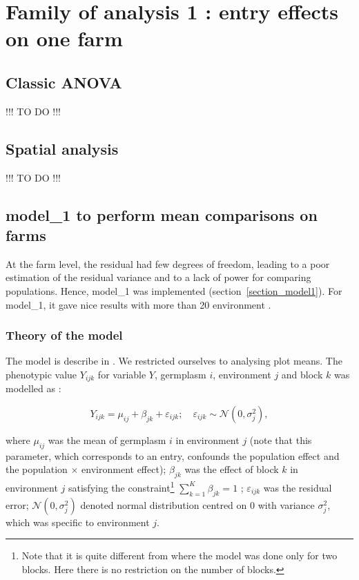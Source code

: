 \documentclass{book}\usepackage[]{graphicx}\usepackage[]{color}
\begin{document}
\newpage


\section{Family of analysis 1 : entry effects on one farm}
\label{section_analysis1}


\subsection{Classic ANOVA}
\label{classic_anova}

!!! TO DO !!!

\newpage


\subsection{Spatial analysis}
\label{spatial_analysis}


!!! TO DO !!!

\newpage


\subsection{model\_1 to perform mean comparisons on farms }
\label{model_1}

At the farm level, the residual had few degrees of freedom, leading to a poor estimation of the residual variance and to a lack of power for comparing populations.
Hence, model\_1 was implemented (section~\ref{section_model1}).
For model\_1, it gave nice results with more than 20 environment \citep{riviere_hierarchical_2015}.

\subsubsection{Theory of the model}

The model is describe in \citet{riviere_hierarchical_2015}.
We restricted ourselves to analysing plot means.
The phenotypic value $Y_{ijk}$ for variable $Y$, germplasm $i$, environment $j$ and block $k$ was modelled as :

\begin{equation}
	Y_{ijk} = \mu_{ij} + \beta_{jk} + \varepsilon_{ijk} ; \quad \varepsilon_{ijk} \sim \mathcal{N} (0,\sigma^2_{j}),
	\label{model1}
\end{equation}

where
$\mu_{ij}$ was the mean of germplasm $i$ in environment $j$ (note that this parameter, which corresponds to an entry, confounds the population effect and the population $\times$ environment effect);
$\beta_{jk}$ was the effect of block $k$ in environment $j$ satisfying the constraint\footnote{Note that it is quite different from \citet{riviere_hierarchical_2015} where the model was done only for two blocks. Here there is no restriction on the number of blocks.} $\sum\limits_{k=1}^K \beta_{jk} = 1$ ;
$\varepsilon_{ijk}$ was the residual error;
$\mathcal{N} (0,\sigma^2_{j})$ denoted normal distribution centred on 0 with variance $\sigma^2_{j}$, which was specific to environment $j$.
\end{document}
